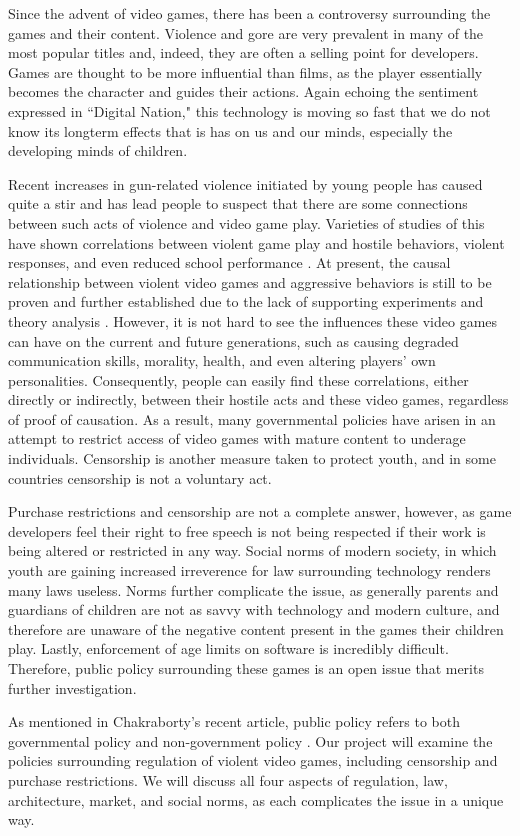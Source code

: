

\indent\indent Since the advent of video games, there has been a controversy surrounding the games and their content. Violence and gore are very prevalent in many of the most popular titles and, indeed, they are often a selling point for developers. Games are thought to be more influential than films, as the player essentially becomes the character and guides their actions. Again echoing the sentiment expressed in ``Digital Nation," this technology is moving so fast that we do not know its longterm effects that is has on us and our minds, especially the developing minds of children.

Recent increases in gun-related violence initiated by young people has caused quite a stir and has lead people to suspect that there are some connections between such acts of violence and video game play. Varieties of studies of this have shown correlations between violent game play and hostile behaviors, violent responses, and even reduced school performance \cite{barlett2009, gentile2004, anderson2003}. At present, the causal relationship between violent video games and aggressive behaviors is still to be proven and further established due to the lack of supporting experiments and theory analysis \cite{ferguson2013}. However, it is not hard to see the influences these video games can have on the current and future generations, such as causing degraded communication skills, morality, health, and even altering players' own personalities. Consequently, people can easily find these correlations, either directly or indirectly, between their hostile acts and these video games, regardless of proof of causation. As a result, many governmental policies have arisen in an attempt to restrict access of video games with mature content to underage individuals. Censorship is another measure taken to protect youth, and in some countries censorship is not a voluntary act.

Purchase restrictions and censorship are not a complete answer, however, as game developers feel their right to free speech is not being respected if their work is being altered or restricted in any way. Social norms of modern society, in which youth are gaining increased irreverence for law surrounding technology renders many laws useless. Norms further complicate the issue, as generally parents and guardians of children are not as savvy with technology and modern culture, and therefore are unaware of the negative content present in the games their children play. Lastly, enforcement of age limits on software is incredibly difficult. Therefore, public policy surrounding these games is an open issue that merits further investigation.

As mentioned in Chakraborty's recent article, public policy refers to both governmental policy and non-government policy \cite{chakraborty2015}. Our project will examine the policies surrounding regulation of violent video games, including censorship and purchase restrictions. We will discuss all four aspects of regulation, law, architecture, market, and social norms, as each complicates the issue in a unique way.
